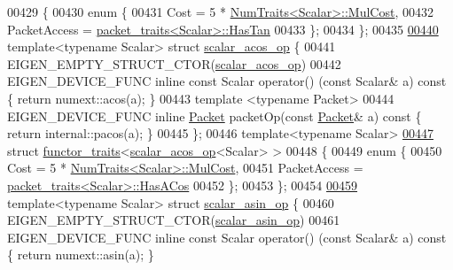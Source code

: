 \begin{DoxyCode}
00429 \{
00430   \textcolor{keyword}{enum} \{
00431     Cost = 5 * \hyperlink{group___core___module_struct_eigen_1_1_num_traits}{NumTraits<Scalar>::MulCost},
00432     PacketAccess = \hyperlink{struct_eigen_1_1internal_1_1packet__traits}{packet\_traits<Scalar>::HasTan}
00433   \};
00434 \};
00435 
\hyperlink{struct_eigen_1_1internal_1_1scalar__acos__op}{00440} \textcolor{keyword}{template}<\textcolor{keyword}{typename} Scalar> \textcolor{keyword}{struct }\hyperlink{struct_eigen_1_1internal_1_1scalar__acos__op}{scalar\_acos\_op} \{
00441   EIGEN\_EMPTY\_STRUCT\_CTOR(\hyperlink{struct_eigen_1_1internal_1_1scalar__acos__op}{scalar\_acos\_op})
00442   EIGEN\_DEVICE\_FUNC \textcolor{keyword}{inline} \textcolor{keyword}{const} Scalar operator() (\textcolor{keyword}{const} Scalar& a)\textcolor{keyword}{ const }\{ \textcolor{keywordflow}{return} numext::acos(a); \}
00443   \textcolor{keyword}{template} <\textcolor{keyword}{typename} Packet>
00444   EIGEN\_DEVICE\_FUNC \textcolor{keyword}{inline} \hyperlink{union_eigen_1_1internal_1_1_packet}{Packet} packetOp(\textcolor{keyword}{const} \hyperlink{union_eigen_1_1internal_1_1_packet}{Packet}& a)\textcolor{keyword}{ const }\{ \textcolor{keywordflow}{return} internal::pacos(a); 
      \}
00445 \};
00446 \textcolor{keyword}{template}<\textcolor{keyword}{typename} Scalar>
\hyperlink{struct_eigen_1_1internal_1_1functor__traits_3_01scalar__acos__op_3_01_scalar_01_4_01_4}{00447} \textcolor{keyword}{struct }\hyperlink{struct_eigen_1_1internal_1_1functor__traits}{functor\_traits}<\hyperlink{struct_eigen_1_1internal_1_1scalar__acos__op}{scalar\_acos\_op}<Scalar> >
00448 \{
00449   \textcolor{keyword}{enum} \{
00450     Cost = 5 * \hyperlink{group___core___module_struct_eigen_1_1_num_traits}{NumTraits<Scalar>::MulCost},
00451     PacketAccess = \hyperlink{struct_eigen_1_1internal_1_1packet__traits}{packet\_traits<Scalar>::HasACos}
00452   \};
00453 \};
00454 
\hyperlink{struct_eigen_1_1internal_1_1scalar__asin__op}{00459} \textcolor{keyword}{template}<\textcolor{keyword}{typename} Scalar> \textcolor{keyword}{struct }\hyperlink{struct_eigen_1_1internal_1_1scalar__asin__op}{scalar\_asin\_op} \{
00460   EIGEN\_EMPTY\_STRUCT\_CTOR(\hyperlink{struct_eigen_1_1internal_1_1scalar__asin__op}{scalar\_asin\_op})
00461   EIGEN\_DEVICE\_FUNC \textcolor{keyword}{inline} \textcolor{keyword}{const} Scalar operator() (\textcolor{keyword}{const} Scalar& a)\textcolor{keyword}{ const }\{ \textcolor{keywordflow}{return} numext::asin(a); \}

\end{DoxyCode}
